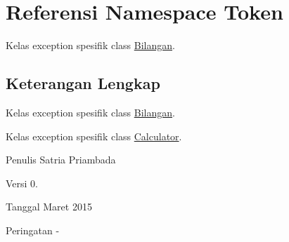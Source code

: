 \hypertarget{namespaceToken}{}\section{Referensi Namespace Token}
\label{namespaceToken}


Kelas exception spesifik class \hyperlink{classBilangan}{Bilangan}.  




\subsection{Keterangan Lengkap}
Kelas exception spesifik class \hyperlink{classBilangan}{Bilangan}. 

Kelas exception spesifik class \hyperlink{classCalculator}{Calculator}.

\begin{DoxyAuthor}{Penulis}
Satria Priambada 
\end{DoxyAuthor}
\begin{DoxyVersion}{Versi}
0. 
\end{DoxyVersion}
\begin{DoxyDate}{Tanggal}
Maret 2015 
\end{DoxyDate}
\begin{DoxyWarning}{Peringatan}
-\/ 
\end{DoxyWarning}
